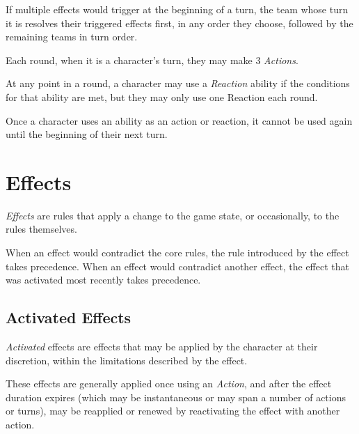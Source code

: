 \vspace{0.4em}

If multiple effects would trigger at the beginning of a turn,
the team whose turn it is resolves their triggered effects first, 
in any order they choose, followed by the remaining teams in turn order.

\vspace{0.4em}

Each round, when it is a character's turn, they may make 3 \textit{Actions}.

\vspace{0.4em}

At any point in a round, a character may use a \textit{Reaction} ability
if the conditions for that ability are met, 
but they may only use one Reaction each round.

\vspace{0.4em}

Once a character uses an ability as an action or reaction, 
it cannot be used again until the beginning of their next turn.




\section{Effects}
\textit{Effects} are rules that apply a change to the game state, or occasionally, to the rules themselves.

\vspace{0.4em}

When an effect would contradict the core rules, the rule introduced by the effect takes precedence.
When an effect would contradict another effect, the effect that was activated most recently takes precedence.

\subsection{Activated Effects}
\textit{Activated} effects are effects that may be applied by the character at their discretion,
within the limitations described by the effect.

\vspace{0.4em}

These effects are generally applied once using an \textit{Action}, and after the effect duration expires
(which may be instantaneous or may span a number of actions or turns),
may be reapplied or renewed by reactivating the effect with another action.

\vspace{0.4em}

